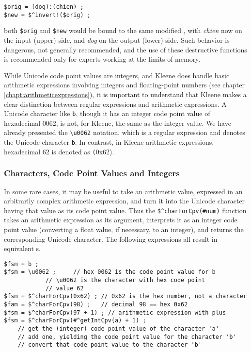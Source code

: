 \begin{Verbatim}
$orig = (dog):(chien) ;
$new = $^invert!($orig) ;
\end{Verbatim}

\noindent
both \verb!$orig! and \verb!$new! would be bound to the same
modified \fsm{}, with \emph{chien} now on the input (upper) side, and \emph{dog} on
the output (lower) side.  Such behavior is dangerous, not generally recommended, and the use of these
destructive functions is recommended only for experts working at the limits
of memory.

While Unicode code point values are integers, and Kleene does handle basic
arithmetic expressions involving integers and floating-point numbers (see chapter
\ref{chapt:arithmeticexpressions}), it is important to understand
that Kleene makes a clear distinction between regular expressions and arithmetic expressions.
A Unicode character like \texttt{b}, though it has an integer code point value of hexadecimal 0062, is
not, for Kleene, the same as the integer value.  We have already presented the \verb!\u0062! notation,
which is a regular expression and denotes the Unicode character \texttt{b}.  In contrast, in Kleene arithmetic
expressions, hexadecimal 62 is denoted as \texttt(0x62).  

\subsubsection{Characters, Code Point Values and Integers}

In some rare cases, it may be useful to take an arithmetic value, expressed in an arbitrarily
complex arithmetic expression, and turn it into the Unicode character having that value as its code point
value.
Thus the \verb!$^charForCpv(#num)! function takes an arithmetic expression as its
argument, interprets it as an integer code point value (converting a
float value, if necessary, to an integer), and returns the
corresponding Unicode character.  The following expressions all result
in equivalent \fst{}s.

\begin{Verbatim}
$fsm = b ;
$fsm = \u0062 ;		// hex 0062 is the code point value for b
			// \u0062 is the character with hex code point
			// value 62
$fsm = $^charForCpv(0x62) ;	// 0x62 is the hex number, not a character
$fam = $^charForCpv(98) ;   // decimal 98 == hex 0x62
$fsm = $^charForCpv(97 + 1) ; // arithmetic expression with plus
$fsm = $^charForCpv(#^getIntCpv(a) + 1) ;
	// get the (integer) code point value of the character 'a'
	// add one, yielding the code point value for the character 'b'
	// convert that code point value to the character 'b'
\end{Verbatim}


